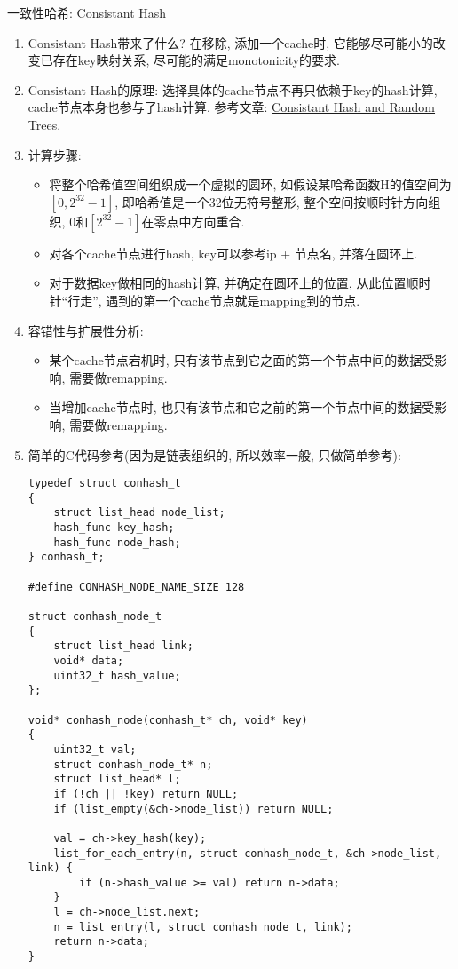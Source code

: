\vspace {10pt}
{ \ZHH 一致性哈希: Consistant Hash }
\begin {enumerate}
    \item { Consistant Hash带来了什么? 在移除, 添加一个cache时, 它能够尽可能小的改变已存在key映射关系, 尽可能的满足monotonicity的要求. }
    \item { Consistant Hash的原理: 选择具体的cache节点不再只依赖于key的hash计算, cache节点本身也参与了hash计算. 参考文章: \href{http://www.akamai.com/dl/technical_publications/ConsistenHashingandRandomTreesDistributedCachingprotocolsforrelievingHotSpotsontheworldwideweb.pdf}{Consistant Hash and Random Trees}. }
    \item { 计算步骤: }
        \begin {itemize}
        \item { 将整个哈希值空间组织成一个虚拟的圆环, 如假设某哈希函数H的值空间为$[0, 2^{32}-1]$, 即哈希值是一个32位无符号整形, 整个空间按顺时针方向组织, 0和$[2^{32}-1]$在零点中方向重合. }
        \item { 对各个cache节点进行hash, key可以参考ip + 节点名, 并落在圆环上. }
        \item { 对于数据key做相同的hash计算, 并确定在圆环上的位置, 从此位置顺时针“行走”, 遇到的第一个cache节点就是mapping到的节点. }
        \end {itemize}
    \item { 容错性与扩展性分析: }
        \begin {itemize}
        \item { 某个cache节点宕机时, 只有该节点到它之面的第一个节点中间的数据受影响, 需要做remapping. }
        \item { 当增加cache节点时, 也只有该节点和它之前的第一个节点中间的数据受影响, 需要做remapping. }
        \end {itemize}
    \item { 简单的C代码参考(因为是链表组织的, 所以效率一般, 只做简单参考): }
\begin{lstlisting}[language={[ANSI]C}]
typedef struct conhash_t
{
    struct list_head node_list;
    hash_func key_hash;
    hash_func node_hash;
} conhash_t;

#define CONHASH_NODE_NAME_SIZE 128

struct conhash_node_t
{
    struct list_head link;
    void* data;
    uint32_t hash_value;
};

void* conhash_node(conhash_t* ch, void* key)
{
    uint32_t val;
    struct conhash_node_t* n;
    struct list_head* l;
    if (!ch || !key) return NULL;
    if (list_empty(&ch->node_list)) return NULL;

    val = ch->key_hash(key);
    list_for_each_entry(n, struct conhash_node_t, &ch->node_list, link) {
        if (n->hash_value >= val) return n->data;
    }
    l = ch->node_list.next;
    n = list_entry(l, struct conhash_node_t, link);
    return n->data;
}
\end{lstlisting}
\end {enumerate}



